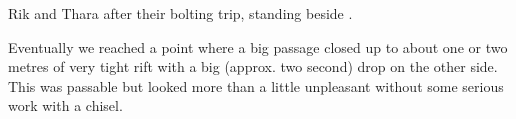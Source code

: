\begin{marginfigure}
\caption{Rik and Thara after their bolting trip, standing beside . }
\end{marginfigure}


Eventually we reached a point where a big passage closed up to about one
or two metres of very tight rift with a big (approx. two second) drop on
the other side. This was passable but looked more than a little
unpleasant without some serious work with a chisel.

